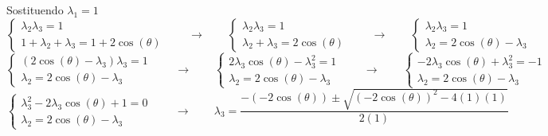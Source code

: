 ﻿\documentclass[11pt, a4paper]{article}
\begin{document}
Sostituendo \( \lambda_{1} = 1 \)
\[
    \begin{cases}
        \lambda_{2}\lambda_{3} = 1\\
        1 + \lambda_{2} + \lambda_{3} = 1 + 2\cos(\theta)
    \end{cases}
    \qquad\longrightarrow\qquad
    \begin{cases}
        \lambda_{2}\lambda_{3} = 1\\
        \lambda_{2} + \lambda_{3} = 2\cos(\theta)
    \end{cases}
    \qquad\longrightarrow\qquad
    \begin{cases}
        \lambda_{2}\lambda_{3} = 1\\
        \lambda_{2} = 2\cos(\theta) - \lambda_{3}
    \end{cases}
\]
\[
    \begin{cases}
        (2\cos(\theta) - \lambda_{3})\lambda_{3} = 1\\
        \lambda_{2} = 2\cos(\theta) - \lambda_{3}
    \end{cases}
    \qquad\longrightarrow\qquad
    \begin{cases}
        2\lambda_{3}\cos(\theta) - \lambda_{3}^{2} = 1\\
        \lambda_{2} = 2\cos(\theta) - \lambda_{3}
    \end{cases}
    \qquad\longrightarrow\qquad
    \begin{cases}
        -2\lambda_{3}\cos(\theta) + \lambda_{3}^{2} = -1\\
        \lambda_{2} = 2\cos(\theta) - \lambda_{3}
    \end{cases}
\]
\[
    \begin{cases}
        \lambda_{3}^{2} - 2\lambda_{3}\cos(\theta) + 1  = 0\\
        \lambda_{2} = 2\cos(\theta) - \lambda_{3}
    \end{cases}
    \qquad\longrightarrow\qquad
    \lambda_{3} = \frac{-(-2\cos(\theta)) \pm \sqrt{(-2\cos(\theta))^2 - 4(1)(1)}}{2(1)}
\]
\end{document}
